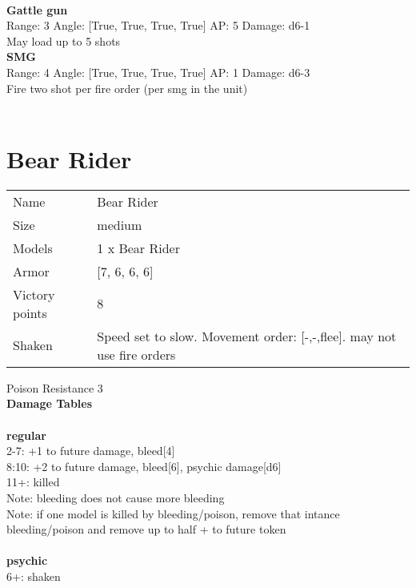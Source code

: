 \ \\
{\bf Gattle gun } \\



Range: 3  Angle: [True, True, True, True] AP: 5 Damage: d6-1 \\
May load up to 5 shots\\ 




{\bf SMG } \\



Range: 4  Angle: [True, True, True, True] AP: 1 Damage: d6-3 \\
Fire two shot per fire order (per smg in the unit)\\ 




 
\ \\














\pagebreak\clearpage

\section{ Bear Rider }

\begin{tabular}{ll}
  Name & Bear Rider \\
  Size & medium\\
  Models & 1 x Bear Rider\\
  Armor & [7, 6, 6, 6]\\
  Victory points & 8\\
  Shaken & Speed set to slow. Movement order: [-,-,flee]. may not use fire orders\\
\end{tabular}

Poison Resistance 3\\ 



{\bf Damage Tables} \\
\ \\ {\bf regular } \\
2-7: +1 to future damage, bleed[4] \\
8:10: +2 to future damage, bleed[6], psychic damage[d6] \\
11+: killed \\
Note: bleeding does not cause more bleeding \\
Note: if one model is killed by bleeding/poison, remove that intance \\ bleeding/poison and remove up to half + to future token \\
\ \\ {\bf psychic } \\
6+: shaken \\



